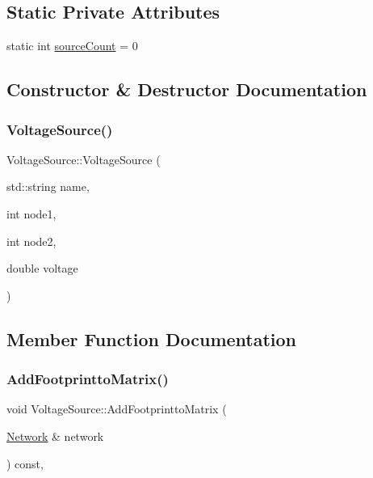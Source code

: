 \subsection*{Static Private Attributes}
\begin{DoxyCompactItemize}
\item 
static int \hyperlink{classVoltageSource_ade16a2431763eeff86ec7a4f842cf6f0}{source\+Count} = 0
\end{DoxyCompactItemize}


\subsection{Constructor \& Destructor Documentation}
\mbox{\label{classVoltageSource_a0afb67483166d71942cefa624f484251}} 
\subsubsection{\texorpdfstring{Voltage\+Source()}{VoltageSource()}}
{\footnotesize\ttfamily Voltage\+Source\+::\+Voltage\+Source (\begin{DoxyParamCaption}\item[{std\+::string}]{name,  }\item[{int}]{node1,  }\item[{int}]{node2,  }\item[{double}]{voltage }\end{DoxyParamCaption})\hspace{0.3cm}{\ttfamily [inline]}}



\subsection{Member Function Documentation}
\mbox{\label{classVoltageSource_a74f8a6a57480e9cff24414e106d2bbf1}} 
\subsubsection{\texorpdfstring{Add\+Footprintto\+Matrix()}{AddFootprinttoMatrix()}}
{\footnotesize\ttfamily void Voltage\+Source\+::\+Add\+Footprintto\+Matrix (\begin{DoxyParamCaption}\item[{\hyperlink{classNetwork}{Network} \&}]{network }\end{DoxyParamCaption}) const\hspace{0.3cm}{\ttfamily [override]}, {\ttfamily [virtual]}}



